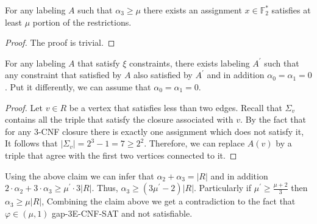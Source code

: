 \documentclass{article}
\begin{document}
\begin{claim}
  For any labeling $A$ such that $\alpha_{3} \ge \mu$ there exists an assignment $x \in \mathbb{F}_{2}^{*}$ satisfies at least $\mu$ portion of the restrictions. 
\end{claim}

\begin{proof}
  The proof is trivial. 
\end{proof}

\begin{claim}
  For any labeling $A$ that satisfy $\xi$ constraints, there exists labeling $A^{\prime}$ such that any constraint that satisfied by $A$ also satisfied by $A^{\prime}$ and in addition $\alpha_{0}=\alpha_{1}=0$. Put it differently, we can assume that $\alpha_{0}=\alpha_{1}=0$.
\end{claim}

\begin{proof}
  Let $v \in R$ be a vertex that satisfies less than two edges. Recall that $\Sigma_{v}$ contains all the triple that satisfy the closure associated with $v$. By the fact that for any 3-CNF closure there is exactly one assignment which does not satisfy it, It follows that $|\Sigma_{v}| = 2^{3}-1 = 7 \ge 2^{2}$. Therefore, we can replace $A(v)$ by a triple that agree with the first two vertices connected to it.     
\end{proof}

Using the above claim we can infer that $\alpha_{2} + \alpha_{3} = |R|$ and in addition $2\cdot \alpha_{2} + 3 \cdot \alpha_{3} \ge \mu^{\prime} \cdot 3|R|$. Thus, $\alpha_{3}\ge \left( 3\mu^{\prime} - 2 \right)|R|$. 
Particularly if $\mu^{\prime} \ge \frac{\mu + 2}{3}$ then $\alpha_{3} \ge \mu|R|$, Combining the claim above we get a contradiction to the fact that $\varphi \in\left( \mu,1 \right)$ gap-3E-CNF-SAT and not satisfiable. 

%
\end{document}
